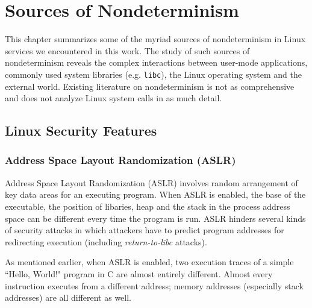 \newenvironment{mylisting}
{\begin{list}{}{\setlength{\leftmargin}{1em}}\item\scriptsize\bfseries}
{\end{list}}

\chapter{Sources of Nondeterminism}
This chapter summarizes some of the myriad sources of nondeterminism
in Linux services we encountered in this work. The study of
such sources of nondeterminism reveals
the complex interactions between user-mode
applications, commonly used system libraries (e.g. \texttt{libc}),
the Linux operating system and the external world.
Existing literature on nondeterminism is not 
as comprehensive and does not analyze
Linux system calls in as much detail. 

\section{Linux Security Features}%

\subsection{Address Space Layout Randomization (ASLR)}
Address Space Layout Randomization (ASLR) involves random arrangement of
key data areas for an executing program. 
When ASLR is enabled, the base of the executable, the position of libaries, heap and the stack in the process address space can be 
different every time the program is run.
ASLR hinders several kinds of security attacks in which attackers have to predict
program addresses for redirecting execution (including
\emph{return-to-libc} attacks).

As mentioned earlier, when ASLR is enabled, two execution traces of a
simple ``Hello, World!" program in C are almost entirely different.
Almost every instruction executes from a different
address; memory addresses (especially stack addresses)
are all different as well.

